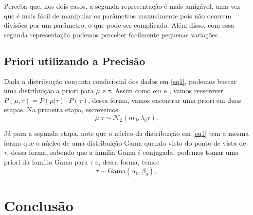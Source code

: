 \documentclass{article}
\begin{document}
	Perceba que, nos dois casos, a segunda representação é mais amigável, uma vez que é mais fácil de manipular os parâmetros manualmente pois não ocorrem divisões por um parâmetro, o que pode ser complicado. Além disso, com essa segunda representação podemos perceber facilmente pequenas variações \cite{stackexchange}.
	
	\subsection*{Priori utilizando a Precisão}
	
	Dada a distribuição conjunta condicional dos dados em \ref{eq1}, podemos buscar uma distribuição a priori para $\mu$ e $\tau$. Assim como em \cite{ehlers} e \cite{ehlers2}, vamos reescrever $P(\mu, \tau) = P(\mu | \tau)\cdot P(\tau)$, dessa forma, vamos encontrar uma priori em duas etapas. Na primeira etapa, escrevemos
	\[\mu | \tau \sim \mathcal{N}_2(m_0, \lambda_0 \tau).\]
	
	Já para a segunda etapa, note que o núcleo da distribuição em \ref{eq1} tem a mesma forma que o núcleo de uma distribuição Gama quando visto do ponto de vista de $\tau$, dessa forma, sabendo que a família Gama é conjugada, podemos tomar uma priori da família Gama para $\tau$ e, dessa forma, temos
	\[\tau \sim \text{Gama}(\alpha_0, \beta_0),\]
	
	
	
	
	
	
	
	
	
	
	
	
	\section*{Conclusão}
	
	
	
	\printbibliography
	
\end{document}

